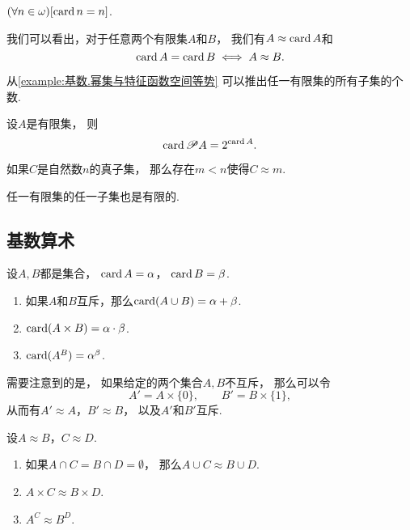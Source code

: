 \begin{example}
\((\forall n\in\omega)[\operatorname{card} n = n]\).
\end{example}

我们可以看出，对于任意两个有限集\(A\)和\(B\)，
我们有\(A \approx \operatorname{card} A\)和\[
	\operatorname{card} A = \operatorname{card} B
	\iff
	A \approx B.
\]

从\cref{example:基数.幂集与特征函数空间等势} 可以推出任一有限集的所有子集的个数.
\begin{theorem}
设\(A\)是有限集，
则\begin{equation}
	\operatorname{card} \mathscr{P} A
	= 2^{\operatorname{card} A}.
\end{equation}
\end{theorem}

\begin{lemma}
如果\(C\)是自然数\(n\)的真子集，
那么存在\(m<n\)使得\(C \approx m\).
\end{lemma}

\begin{theorem}
任一有限集的任一子集也是有限的.
\end{theorem}

\subsection{基数算术}
\begin{definition}
设\(A,B\)都是集合，
\(\operatorname{card} A = \alpha\)，
\(\operatorname{card} B = \beta\).
\begin{enumerate}
	\item 如果\(A\)和\(B\)互斥，那么\(\operatorname{card}(A \cup B)=\alpha+\beta\).
	\item \(\operatorname{card}(A \times B)=\alpha\cdot\beta\).
	\item \(\operatorname{card}(A^B)=\alpha^\beta\).
\end{enumerate}
\end{definition}

需要注意到的是，
如果给定的两个集合\(A,B\)不互斥，
那么可以令\[
	A' = A\times\{0\}, \qquad
	B' = B\times\{1\},
\]
从而有\(A' \approx A\)，\(B' \approx B\)，
以及\(A'\)和\(B'\)互斥.

\begin{theorem}
设\(A \approx B\)，\(C \approx D\).
\begin{enumerate}
	\item 如果\(A \cap C = B \cap D = \emptyset\)，
	那么\(A \cup C \approx B \cup D\).
	\item \(A \times C \approx B \times D\).
	\item \(A^C \approx B^D\).
\end{enumerate}
\end{theorem}

